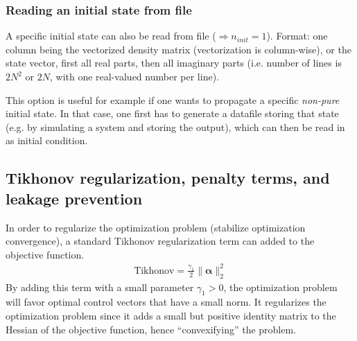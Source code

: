\documentclass[11pt]{article}
\newcommand{\bfa}{\boldsymbol{\alpha}}
\begin{document}
\subsubsection{Reading an initial state from file}
A specific initial state can also be read from file ($\Rightarrow n_{init}=1$). Format: one column being the vectorized density matrix (vectorization is column-wise), or the state vector, first all real parts, then all imaginary parts (i.e. number of lines is $2N^2$ or $2N$, with one real-valued number per line). 

This option is useful for example if one wants to propagate a specific \textit{non-pure} initial state. In that case, one first has to generate a datafile storing that state (e.g. by simulating a system and storing the output), which can then be read in as initial condition. 



\subsection{Tikhonov regularization, penalty terms, and leakage prevention}\label{sec:penalty}

In order to regularize the optimization problem (stabilize optimization convergence), a standard Tikhonov regularization term can added to the objective function. 
\begin{align}
\mbox{Tikhonov} = \frac{\gamma_1}{2} \| \bfa \|^2_2
\end{align}
By adding this term with a small parameter $\gamma_1 > 0$, the optimization problem will favor optimal control vectors that have a small norm. It regularizes the optimization problem since it adds a small but positive identity matrix to the Hessian of the objective function, hence ``convexifying'' the problem.
\end{document}
